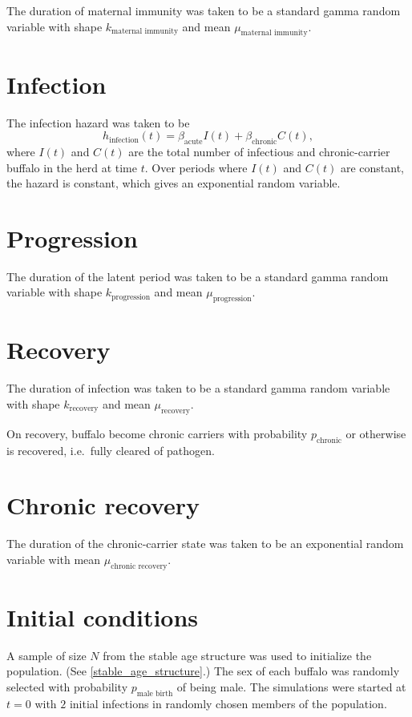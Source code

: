 \documentclass[12pt]{article}
\begin{document}
The duration of maternal immunity was taken to be a standard gamma
random variable with shape $k_{\text{maternal immunity}}$
and mean $\mu_{\text{maternal immunity}}$.


\section{Infection}

The infection hazard was taken to be
\begin{equation}
  h_{\text{infection}}(t) = \beta_{\text{acute}} I(t) +
  \beta_{\text{chronic}} C(t),
\end{equation}
where $I(t)$ and $C(t)$ are the total number of infectious and
chronic-carrier buffalo in the herd at time $t$.  Over periods where
$I(t)$ and $C(t)$ are constant, the hazard is constant, which gives an
exponential random variable.


\section{Progression}

The duration of the latent period was taken to be a standard gamma
random variable with shape $k_{\text{progression}}$
and mean $\mu_{\text{progression}}$.


\section{Recovery}

The duration of infection was taken to be a standard gamma random
variable with shape $k_{\text{recovery}}$ and mean
$\mu_{\text{recovery}}$.

On recovery, buffalo become chronic carriers with probability
$p_{\text{chronic}}$ or otherwise is recovered, i.e.~fully cleared
of pathogen.


\section{Chronic recovery}

The duration of the chronic-carrier state was taken to be an
exponential random variable with mean
$\mu_{\text{chronic recovery}}$.


\section{Initial conditions}

A sample of size $N$ from the stable age structure was used to
initialize the population.  (See \autoref{stable_age_structure}.)  The
sex of each buffalo was randomly selected with probability
$p_{\text{male birth}}$ of being male.  The simulations were started
at $t = 0$ with $2$ initial infections in randomly chosen members of
the population.
\end{document}
